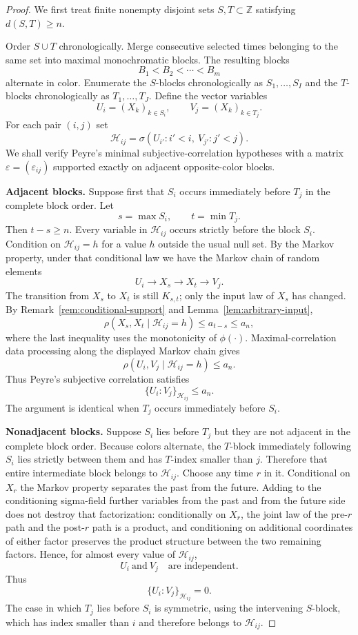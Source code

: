\documentclass[11pt]{article}
\begin{document}
\begin{proof}
We first treat finite nonempty disjoint sets $S,T\subset\mathbb Z$ satisfying $d(S,T)\ge n$.

Order $S\cup T$ chronologically.  Merge consecutive selected times belonging to the same set into maximal monochromatic blocks.  The resulting blocks
\[
 B_1<B_2<\cdots<B_m
\]
alternate in color.  Enumerate the $S$-blocks chronologically as $S_1,\dots,S_I$ and the $T$-blocks chronologically as $T_1,\dots,T_J$.  Define the vector variables
\[
 U_i=(X_k)_{k\in S_i},\qquad V_j=(X_k)_{k\in T_j}.
\]
For each pair $(i,j)$ set
\[
 \mathcal H_{ij}
 =\sigma(U_{i'}:i'<i,\ V_{j'}:j'<j).
\]
We shall verify Peyre's minimal subjective-correlation hypotheses with a matrix $\varepsilon=(\varepsilon_{ij})$ supported exactly on adjacent opposite-color blocks.

\medskip
\noindent\textbf{Adjacent blocks.}
Suppose first that $S_i$ occurs immediately before $T_j$ in the complete block order.  Let
\[
 s=\max S_i,\qquad t=\min T_j.
\]
Then $t-s\ge n$.  Every variable in $\mathcal H_{ij}$ occurs strictly before the block $S_i$.  Condition on $\mathcal H_{ij}=h$ for a value $h$ outside the usual null set.  By the Markov property, under that conditional law we have the Markov chain of random elements
\[
 U_i\longrightarrow X_s\longrightarrow X_t\longrightarrow V_j.
\]
The transition from $X_s$ to $X_t$ is still $K_{s,t}$; only the input law of $X_s$ has changed.  By Remark~\ref{rem:conditional-support} and Lemma~\ref{lem:arbitrary-input},
\[
 \rho(X_s,X_t\mid\mathcal H_{ij}=h)
 \le a_{t-s}\le a_n,
\]
where the last inequality uses the monotonicity of $\phi(\cdot)$.  Maximal-correlation data processing along the displayed Markov chain gives
\[
 \rho(U_i,V_j\mid\mathcal H_{ij}=h)\le a_n.
\]
Thus Peyre's subjective correlation satisfies
\[
 \{U_i:V_j\}_{\mathcal H_{ij}}\le a_n.
\]
The argument is identical when $T_j$ occurs immediately before $S_i$.

\medskip
\noindent\textbf{Nonadjacent blocks.}
Suppose $S_i$ lies before $T_j$ but they are not adjacent in the complete block order.  Because colors alternate, the $T$-block immediately following $S_i$ lies strictly between them and has $T$-index smaller than $j$.  Therefore that entire intermediate block belongs to $\mathcal H_{ij}$.  Choose any time $r$ in it.  Conditional on $X_r$ the Markov property separates the past from the future.  Adding to the conditioning sigma-field further variables from the past and from the future side does not destroy that factorization: conditionally on $X_r$, the joint law of the pre-$r$ path and the post-$r$ path is a product, and conditioning on additional coordinates of either factor preserves the product structure between the two remaining factors.  Hence, for almost every value of $\mathcal H_{ij}$,
\[
 U_i\ \text{and}\ V_j\quad\text{are independent}.
\]
Thus
\[
 \{U_i:V_j\}_{\mathcal H_{ij}}=0.
\]
The case in which $T_j$ lies before $S_i$ is symmetric, using the intervening $S$-block, which has index smaller than $i$ and therefore belongs to $\mathcal H_{ij}$.


\end{proof}
\end{document}
